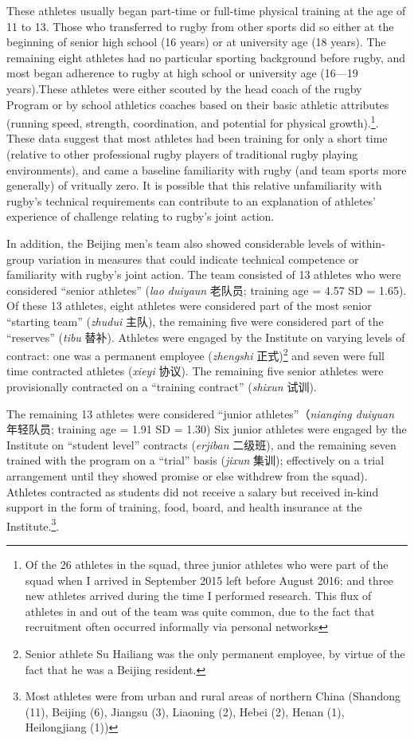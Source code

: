 \begin{CJK}{UTF8}{gbsn}
These athletes usually began part-time or full-time physical training at the age of 11 to 13.  Those who transferred to rugby from other sports did so either at the beginning of senior high school (16 years) or at university age (18 years).  The remaining eight athletes had no particular sporting background before rugby, and most began adherence to rugby at high school or university age (16---19 years).These athletes were either scouted by the head coach of the rugby Program or by school athletics coaches based on their basic athletic attributes (running speed, strength, coordination, and potential for physical growth).\footnote{Of the 26 athletes in the squad, three junior athletes who were part of the squad when I arrived in September 2015 left before August 2016; and three new athletes arrived during the time I performed research.  This flux of athletes in and out of the team was quite common, due to the fact that recruitment often occurred informally via personal networks}.  These data suggest that most athletes had been training for only a short time (relative to other professional rugby players of traditional rugby playing environments), and came a baseline familiarity with rugby (and team sports more generally) of vritually zero.  It is possible that this relative unfamiliarity with rugby's technical requirements can contribute to an explanation of athletes' experience of challenge relating to rugby's joint action.

In addition, the Beijing men's team also showed considerable levels of within-group variation in measures that could indicate technical competence or familiarity with rugby's joint action.  The team consisted of 13 athletes who were considered ``senior athletes'' (\textit{lao duiyaun} 老队员; training age = 4.57 SD = 1.65).  Of these 13 athletes, eight athletes were considered part of the most senior ``starting team'' (\textit{zhudui} 主队), the remaining five were considered part of the ``reserves'' (\textit{tibu} 替补).  Athletes were engaged by the Institute on varying levels of contract: one was a permanent employee (\textit{zhengshi} 正式)\footnote{Senior athlete Su Hailiang was the only permanent employee, by virtue of the fact that he was a Beijing resident.} and seven were full time contracted athletes (\textit{xieyi} 协议).  The remaining five senior athletes were provisionally contracted on a ``training contract'' (\textit{shixun} 试训).

The remaining 13 athletes were considered ``junior athletes''（\textit{nianqing duiyuan} 年轻队员; training age = 1.91 SD = 1.30)
Six junior athletes were engaged by the Institute on ``student level'' contracts (\textit{erjiban} 二级班), and the remaining seven trained with the program on a ``trial'' basis (\textit{jixun} 集训); effectively on a trial arrangement until they showed promise or else withdrew from the squad).  Athletes contracted as students did not receive a salary but received in-kind support in the form of training, food, board, and health insurance at the Institute.\footnote{Most athletes were from urban and rural areas of northern China (Shandong (11), Beijing (6), Jiangsu (3), Liaoning (2), Hebei (2), Henan (1), Heilongjiang (1))}.


\end{CJK}
